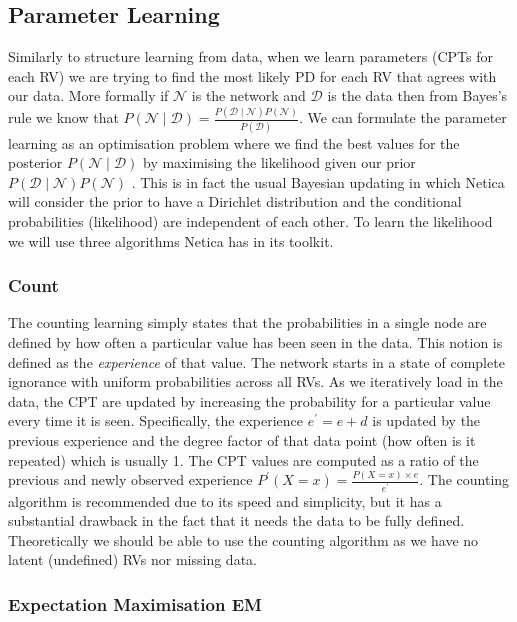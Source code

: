 \documentclass{UoYCSproject}
\begin{document}
\subsection{Parameter Learning}
Similarly to structure learning from data, when we learn parameters (CPTs for each RV) we are trying to find the most likely PD for each RV that agrees with our data. More formally if \(\mathcal{N}\) is the network and \(\mathcal{D}\) is the data then from Bayes's rule we know that \(P(\mathcal{N} \mid \mathcal{D}) = \frac{P(\mathcal{D} \mid \mathcal{N})P(\mathcal{N})}{P(\mathcal{D})}\). We can formulate the parameter learning as an optimisation problem where we find the best values for the posterior \(P(\mathcal{N} \mid \mathcal{D})\) by maximising the likelihood given our prior \(P(\mathcal{D} \mid \mathcal{N})P(\mathcal{N})\) \parencite[46-48]{neticaCman}. This is in fact the usual Bayesian updating in which Netica will consider the prior to have a Dirichlet distribution and the conditional probabilities (likelihood) are independent of each other. To learn the likelihood we will use three algorithms Netica has in its toolkit.
 
\subsubsection{Count \parencite[48-50]{neticaCman}}
The counting learning simply states that the probabilities in a single node are defined by how often a particular value has been seen in the data. This notion is defined as the \textit{experience} of that value. The network starts in a state of complete ignorance with uniform probabilities across all RVs. As we iteratively load in the data, the CPT are updated by increasing the probability for a particular value every time it is seen. Specifically, the experience \(e^{\prime} = e + d\) is updated by the previous experience and the degree factor of that data point (how often is it repeated) which is usually 1. The CPT values are computed as a ratio of the previous and newly observed experience \(P^{\prime}(X=x) = \frac{P(X=x) \times e}{e^{\prime}}\). The counting algorithm is recommended due to its speed and simplicity, but it has a substantial drawback in the fact that it needs the data to be fully defined. Theoretically we should be able to use the counting algorithm as we have no latent (undefined) RVs nor missing data.

\subsubsection{Expectation Maximisation EM} %
\end{document}
